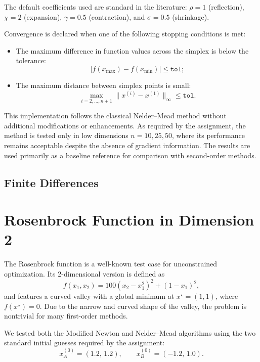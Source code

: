 \documentclass[a4paper,12pt]{article}
\begin{document}
	The default coefficients used are standard in the literature: \( \rho = 1 \) (reflection), \( \chi = 2 \) (expansion), \( \gamma = 0.5 \) (contraction), and \( \sigma = 0.5 \) (shrinkage).
	
	Convergence is declared when one of the following stopping conditions is met:
	\begin{itemize}[nosep]
		\item The maximum difference in function values across the simplex is below the tolerance: 
		\[
		|f(x_{\max}) - f(x_{\min})| \leq \texttt{tol};
		\]
		\item The maximum distance between simplex points is small:
		\[
		\max_{i=2,\dots,n+1} \|x^{(i)} - x^{(1)}\|_{\infty} \leq \texttt{tol}.
		\]
	\end{itemize}
	
	This implementation follows the classical Nelder--Mead method without additional modifications or enhancements. As required by the assignment, the method is tested only in low dimensions \( n = 10, 25, 50 \), where its performance remains acceptable despite the absence of gradient information. The results are used primarily as a baseline reference for comparison with second-order methods.
	
	\newpage
	\subsection{Finite Differences}
	
	\newpage
	
	\section{Rosenbrock Function in Dimension 2}
	
	The Rosenbrock function is a well-known test case for unconstrained optimization. Its 2-dimensional version is defined as
	\[
	f(x_1,x_2) = 100(x_2 - x_1^2)^2 + (1 - x_1)^2,
	\]
	and features a curved valley with a global minimum at \( x^\star = (1,1) \), where \( f(x^\star) = 0 \). Due to the narrow and curved shape of the valley, the problem is nontrivial for many first-order methods.
	
	We tested both the Modified Newton and Nelder–Mead algorithms using the two standard initial guesses required by the assignment:
	\[
	x^{(0)}_A = (1.2,\,1.2), \qquad x^{(0)}_B = (-1.2,\,1.0).
	\]
	
\end{document}
